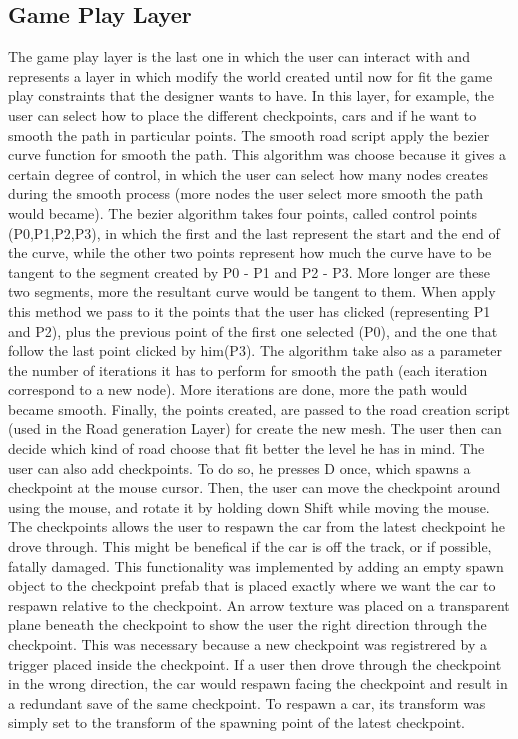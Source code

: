 \documentclass[conference]{IEEEtran}
\begin{document}
\subsection{Game Play Layer}

The game play layer is the last one in which the user can interact with and represents a layer in which modify the world created until now for fit the game play constraints that the designer wants to have. In this layer, for example, the user can select how to place the different checkpoints, cars and if he want to smooth the path in particular points. \newline
The smooth road script apply the bezier curve function for smooth the path. This algorithm was choose because it gives a certain degree of control, in which the user can select how many nodes creates during the smooth process (more nodes the user select more smooth the path would became). The bezier algorithm takes four points, called control points (P0,P1,P2,P3), in which the first and the last represent the start and the end of the curve, while the other two points represent how much the curve have to be tangent to the segment created by P0 - P1 and P2 - P3. More longer are these two segments, more the resultant curve would be tangent to them. When apply this method we pass to it the points that the user has clicked (representing P1 and P2), plus the previous point of the first one selected (P0), and the one that follow the last point clicked by him(P3). The algorithm take also as a parameter the number of iterations it has to perform for smooth the path (each iteration correspond to a new node). More iterations are done, more the path would became smooth. Finally, the points created, are passed to the road creation script (used in the Road generation Layer) for create the new mesh.\newline
The user then can decide which kind of road choose that fit better the level he has in mind.\newline\newline
The user can also add checkpoints. To do so, he presses D once, which spawns a checkpoint at the mouse cursor. Then, the user can move the checkpoint around using the mouse, and rotate it by holding down Shift while moving the mouse. The checkpoints allows the user to respawn the car from the latest checkpoint he drove through. This might be benefical if the car is off the track, or if possible, fatally damaged. This functionality was implemented by adding an empty spawn object to the checkpoint prefab that is placed exactly where we want the car to respawn relative to the checkpoint. An arrow texture was placed on a transparent plane beneath the checkpoint to show the user the right direction through the checkpoint. This was necessary because a new checkpoint was registrered by a trigger placed inside the checkpoint. If a user then drove through the checkpoint in the wrong direction, the car would respawn facing the checkpoint and result in a redundant save of the same checkpoint. To respawn a car, its transform was simply set to the transform of the spawning point of the latest checkpoint.
\end{document}
